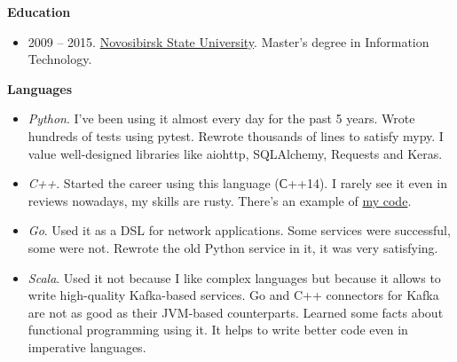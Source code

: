 \documentclass[final]{letter}
\begin{document}
{\bf Education}
\begin{itemize}
  \item 2009 -- 2015. \href{https://www.nsu.ru/n/}{Novosibirsk State University}. Master's degree in Information Technology.
\end{itemize}

{\bf Languages}
\begin{itemize}
\item \textit{Python}. I've been using it almost every day for the past 5 years.
  Wrote hundreds of tests using pytest. Rewrote thousands of lines to satisfy mypy.
  I value well-designed libraries like aiohttp, SQLAlchemy, Requests and Keras.
\item \textit{C++}. Started the career using this language (С++14). I rarely see it even in reviews nowadays, my skills are rusty.
  There's an example of \href{https://github.com/neexee/review}{my code}.
\item \textit{Go}. Used it as a DSL for network applications. Some services were successful, some were not.
   Rewrote the old Python service in it, it was very satisfying.
\item \textit{Scala}. Used it not because I like complex languages but because it allows to write high-quality Kafka-based services.
  Go and C++ connectors for Kafka are not as good as their JVM-based counterparts.
  Learned some facts about functional programming using it. It helps to write better code even in imperative languages.
\end{itemize}
\end{document}
